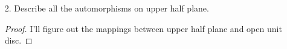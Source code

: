\documentclass{article}
\begin{document}
\begin{enumerate}
\begin{proof}
\begin{equation*}
\begin{split}
&\Rightarrow \abs{\frac{M(f-w_0)}{M^2-\bar{w}_0f}}\leq \abs{\frac{z-z_0}{R^2-\bar{z}_0z}}
\end{split}
\end{equation*} 
Therefore,
\begin{equation*}
\abs{\frac{M(f(z)-w_0)}{M^2-\bar{w}_0f(z)}}\leq \abs{\frac{z-z_0}{R^2-\bar{z}_0 z}}
\end{equation*}
\end{proof}
\item[2.] Describe all the automorphisms on upper half plane.
\begin{proof}
I'll figure out the mappings between upper half plane and open unit disc.
\end{proof}
\end{enumerate}
\end{document}
